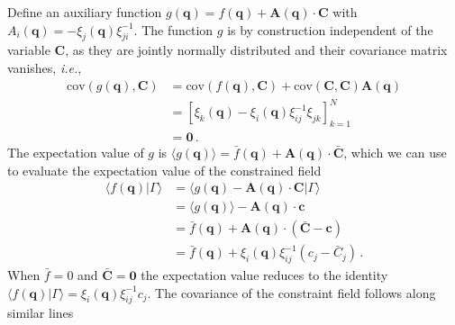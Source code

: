 \documentclass[a4paper, 11pt]{article}
\begin{document}
Define an auxiliary function $g(\bm{q}) = f(\bm{q}) + \bm{A}(\bm{q}) \cdot \bm{C}$ with $A_i(\bm{q}) = -\xi_j(\bm{q}) \xi_{ji}^{-1}$. The function $g$ is by construction independent of the variable $\bm{C}$, as they are jointly normally distributed and their covariance matrix vanishes, \textit{i.e.}, 
\begin{align}
\text{cov}(g(\bm{q}),\bm{C})
&=\text{cov}(f(\bm{q}),\bm{C}) +  \text{cov}(\bm{C},\bm{C}) \bm{A}(\bm{q})\nonumber \\
&=[\xi_k(\bm{q}) - \xi_i(\bm{q}) \xi_{ij}^{-1}\xi_{jk}]_{k=1}^N\nonumber\\
&=\bm{0}\,.
\end{align}
The expectation value of $g$ is $\langle g(\bm{q})\rangle = \bar{f}(\bm{q}) + \bm{A}(\bm{q}) \cdot \bar{\bm{C}}$, which we can use to evaluate the expectation value of the constrained field
\begin{align}
\langle f(\bm{q}) | \Gamma \rangle 
&=\langle g(\bm{q}) - \bm{A}(\bm{q})\cdot \bm{C}|\Gamma\rangle\nonumber\\
&=\langle g(\bm{q})\rangle - \bm{A}(\bm{q}) \cdot \bm{c}\nonumber\\
&=\bar{f}(\bm{q}) + \bm{A}(\bm{q})\cdot (\bar{\bm{C}}-\bm{c})\nonumber\\
&= \bar{f}(\bm{q}) + \xi_i(\bm{q})\xi_{ij}^{-1}(c_j -\bar{C}_j)\,.
\end{align}
When $\bar{f} = 0$ and $\bar{\bm{C}}=\bm{0}$ the expectation value reduces to the identity $\langle f(\bm{q}) | \Gamma \rangle =\xi_i(\bm{q})\xi_{ij}^{-1}c_j$. The covariance of the constraint field follows along similar lines
\end{document}
